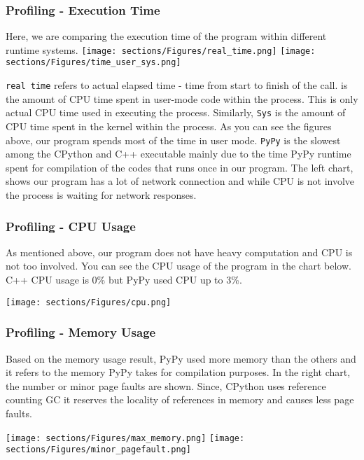 \subsubsection{Profiling - Execution Time}
Here, we are comparing the execution time of the program within different runtime systems. 
\texttt{[image: sections/Figures/real\_time.png]}
\texttt{[image: sections/Figures/time\_user\_sys.png]}

\texttt{real time} refers to actual elapsed time - time from start to finish of the call.  is the amount of CPU time spent in user-mode code within the process. This is only actual CPU time used in executing the process. Similarly, \texttt{Sys} is the amount of CPU time spent in the kernel within the process. As you can see the figures above, our program spends most of the time in user mode. \texttt{PyPy} is the slowest among the CPython and C++ executable mainly due to the time PyPy runtime spent for compilation of the codes that runs once in our program. The left chart, shows our program has a lot of network connection and while CPU is not involve the process is waiting for network responses.

\subsubsection{Profiling - CPU Usage}
As mentioned above, our program does not have heavy computation and CPU is not too involved. You can see the CPU usage of the program in the chart below. C++ CPU usage is 0\% but PyPy used CPU up to 3\%.

\texttt{[image: sections/Figures/cpu.png]}


\subsubsection{Profiling - Memory Usage}
Based on the memory usage result, PyPy used more memory than the others and it refers to the memory PyPy takes for compilation purposes. In the right chart, the number or minor page faults are shown. Since, CPython uses reference counting GC it reserves the locality of references in memory and causes less page faults. 

\texttt{[image: sections/Figures/max\_memory.png]}
\texttt{[image: sections/Figures/minor\_pagefault.png]}

